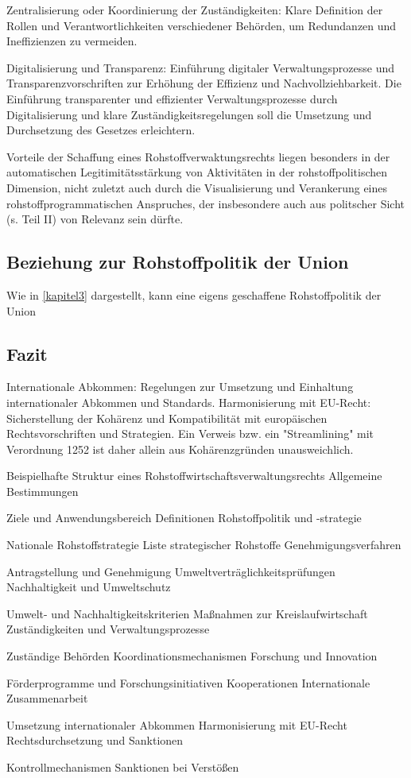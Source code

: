 \documentclass[12pt,a4paper,oneside]{book} %
\begin{document}
Zentralisierung oder Koordinierung der Zuständigkeiten: Klare Definition der Rollen und Verantwortlichkeiten verschiedener Behörden, um Redundanzen und Ineffizienzen zu vermeiden.

Digitalisierung und Transparenz: Einführung digitaler Verwaltungsprozesse und Transparenzvorschriften zur Erhöhung der Effizienz und Nachvollziehbarkeit.
Die Einführung transparenter und effizienter Verwaltungsprozesse durch Digitalisierung und klare Zuständigkeitsregelungen soll die Umsetzung und Durchsetzung des Gesetzes erleichtern.

Vorteile der Schaffung eines Rohstoffverwaktungsrechts liegen besonders in der automatischen Legitimitätsstärkung von Aktivitäten in der rohstoffpolitischen Dimension, nicht zuletzt auch durch die Visualisierung und Verankerung eines rohstoffprogrammatischen Anspruches, der insbesondere auch aus politscher Sicht (s. Teil II) von Relevanz sein dürfte.

\subsection{Beziehung zur Rohstoffpolitik der Union}
Wie in \ref{kapitel3} dargestellt, kann eine eigens geschaffene Rohstoffpolitik der Union 

\subsection{Fazit}



Internationale Abkommen: Regelungen zur Umsetzung und Einhaltung internationaler Abkommen und Standards.
Harmonisierung mit EU-Recht: Sicherstellung der Kohärenz und Kompatibilität mit europäischen Rechtsvorschriften und Strategien.
Ein Verweis bzw. ein "Streamlining" mit Verordnung 1252 ist daher allein aus Kohärenzgründen unausweichlich.

Beispielhafte Struktur eines Rohstoffwirtschaftsverwaltungsrechts
Allgemeine Bestimmungen

Ziele und Anwendungsbereich
Definitionen
Rohstoffpolitik und -strategie

Nationale Rohstoffstrategie
Liste strategischer Rohstoffe
Genehmigungsverfahren

Antragstellung und Genehmigung
Umweltverträglichkeitsprüfungen
Nachhaltigkeit und Umweltschutz

Umwelt- und Nachhaltigkeitskriterien
Maßnahmen zur Kreislaufwirtschaft
Zuständigkeiten und Verwaltungsprozesse

Zuständige Behörden
Koordinationsmechanismen
Forschung und Innovation

Förderprogramme und Forschungsinitiativen
Kooperationen
Internationale Zusammenarbeit

Umsetzung internationaler Abkommen
Harmonisierung mit EU-Recht
Rechtsdurchsetzung und Sanktionen

Kontrollmechanismen
Sanktionen bei Verstößen
\end{document}
